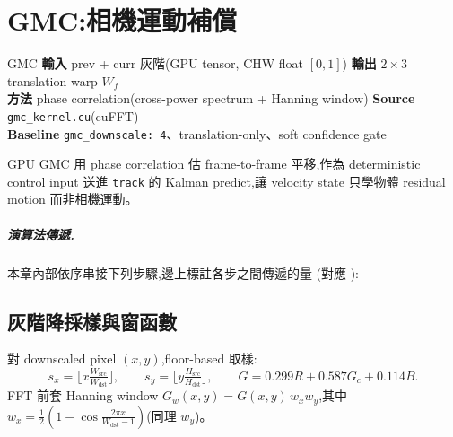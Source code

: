 \chapter{GMC:相機運動補償}\label{ch:gmc}

\begin{center}\end{center}

\begin{contract}{GMC}
\textbf{輸入}\; prev + curr 灰階(GPU tensor, CHW float \([0,1]\))\quad
\textbf{輸出}\; \(2\times3\) translation warp \(W_f\)\\
\textbf{方法}\; phase correlation(cross-power spectrum + Hanning window)\quad
\textbf{Source}\; \texttt{gmc\_kernel.cu}(cuFFT)\\
\textbf{Baseline}\; \texttt{gmc\_downscale: 4}、translation-only、soft confidence gate
\end{contract}

\noindent
GPU GMC 用 phase correlation 估 frame-to-frame 平移,作為 deterministic control
input 送進 \texttt{track} 的 Kalman predict,讓 velocity state 只學物體
residual motion 而非相機運動。

\paragraph{演算法傳遞.} 本章內部依序串接下列步驟,邊上標註各步之間傳遞的量
(對應 ):

\gmcflow

\section{灰階降採樣與窗函數}\label{sec:gmc-down}
對 downscaled pixel \((x,y)\),floor-based 取樣:
\begin{equation}\label{eq:gmc-sample}
  s_x=\Big\lfloor x\tfrac{W_{\mathrm{src}}}{W_{\mathrm{dst}}}\Big\rfloor,\qquad
  s_y=\Big\lfloor y\tfrac{H_{\mathrm{src}}}{H_{\mathrm{dst}}}\Big\rfloor,\qquad
  G=0.299R+0.587G_c+0.114B.
\end{equation}
FFT 前套 Hanning window \(G_w(x,y)=G(x,y)\,w_x w_y\),其中
\(w_x=\tfrac12(1-\cos\tfrac{2\pi x}{W_{\mathrm{dst}}-1})\)(同理 \(w_y\))。

